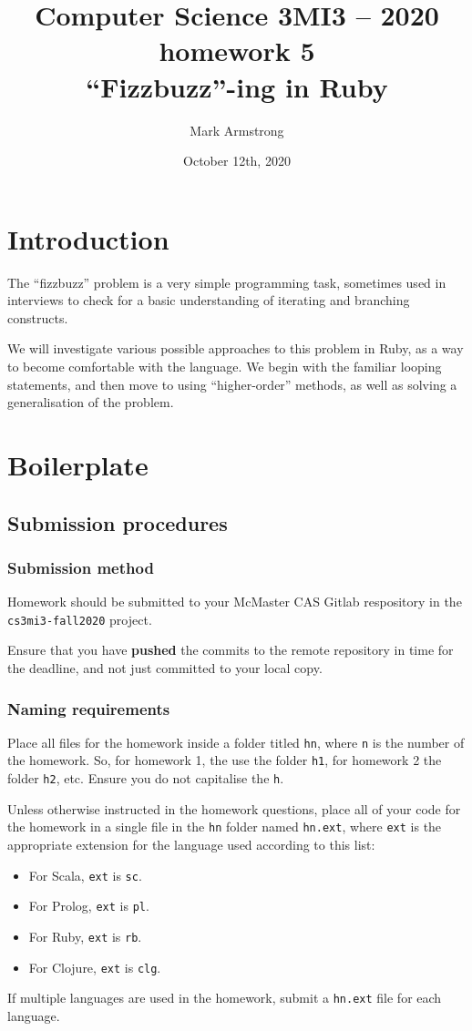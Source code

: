 \documentclass[11pt]{article}
\author{Mark Armstrong}
\date{October 12th, 2020}
\title{Computer Science 3MI3 – 2020 homework 5\\\medskip
\large “Fizzbuzz”-ing in Ruby}
\begin{document}
\maketitle
\tableofcontents


\section*{Introduction}
\label{sec:org91af0fb}
The “fizzbuzz” problem is a very simple programming task,
sometimes used in interviews to check for a basic understanding
of iterating and branching constructs.

We will investigate various possible approaches to
this problem in Ruby, as a way to become comfortable
with the language.
We begin with the familiar looping statements,
and then move to using “higher-order” methods,
as well as solving a generalisation of the problem.

\section*{Boilerplate}
\label{sec:org3488652}
\subsection*{Submission procedures}
\label{sec:org88ef8ae}
\subsubsection*{Submission method}
\label{sec:org8291ccc}

Homework should be submitted to your McMaster CAS Gitlab respository
in the \texttt{cs3mi3-fall2020} project.

Ensure that you have \textbf{pushed} the commits to the remote repository
in time for the deadline, and not just committed to your local copy.

\subsubsection*{Naming requirements}
\label{sec:orgf9ae364}

Place all files for the homework
inside a folder titled \texttt{hn}, where \texttt{n} is the number of the homework.
So, for homework 1, the use the folder \texttt{h1}, for homework 2 the folder \texttt{h2}, etc.
Ensure you do not capitalise the \texttt{h}.

Unless otherwise instructed in the homework questions,
place all of your code for the homework
in a single file in the \texttt{hn} folder named \texttt{hn.ext},
where \texttt{ext} is the appropriate extension for the language used
according to this list:
\begin{itemize}
\item For Scala, \texttt{ext} is \texttt{sc}.
\item For Prolog, \texttt{ext} is \texttt{pl}.
\item For Ruby, \texttt{ext} is \texttt{rb}.
\item For Clojure, \texttt{ext} is \texttt{clg}.
\end{itemize}
If multiple languages are used in the homework,
submit a \texttt{hn.ext} file for each language.
\end{document}
